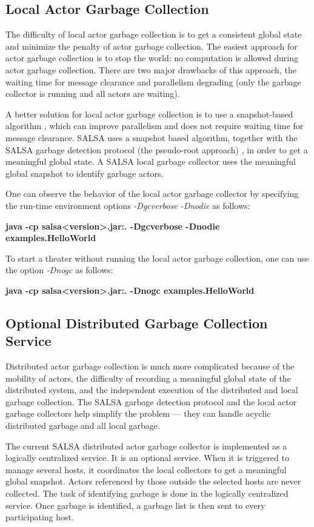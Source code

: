 \subsection{Local Actor Garbage Collection}
The difficulty of local actor garbage collection is to get a consistent 
global state and minimize the penalty 
of actor garbage collection. The easiest approach for actor garbage 
collection is to stop the world: no computation is allowed during actor 
garbage collection. There are two major drawbacks of this approach,
the waiting time for message clearance and 
parallelism degrading 
(only the garbage collector is running and all actors are waiting).

A better solution for local actor garbage collection is 
to use a snapshot-based algorithm \cite{wang-varela-snapshot-tr-2006}, which can improve parallelism 
and does not require waiting time for message clearance.
SALSA uses a snapshot based algorithm, together with the SALSA 
garbage detection protocol (the pseudo-root approach) \cite{wang06pr}, 
in order to get a meaningful global
state. A SALSA local garbage collector
uses the meaningful global snapshot to identify garbage actors.

One can observe the behavior of the local actor garbage collector by specifying
the run-time environment options \textit{-Dgcverbose -Dnodie} as follows:  

{\sloppy
\textbf{java -cp salsa{\textless}version{\textgreater}.jar:. -Dgcverbose -Dnodie examples.HelloWorld}
}

To start a theater without running the local actor garbage collection, one can
use the option \textit{-Dnogc} as follows:

\textbf{java -cp salsa{\textless}version{\textgreater}.jar:. -Dnogc examples.HelloWorld}


\subsection{Optional Distributed Garbage Collection Service}
Distributed actor garbage collection is much more complicated because of
the mobility of actors, the difficulty of recording a meaningful global 
state of the distributed system, and the independent execution of the 
distributed and local garbage collection. The SALSA garbage detection 
protocol and the local actor garbage collectors help simplify the problem
--- they can handle acyclic distributed garbage and all local garbage. 

The current SALSA distributed actor garbage collector is implemented as 
a logically centralized service. It is an optional service. When it is 
triggered to manage several hosts, it coordinates the local
collectors to get a meaningful global snapshot. Actors referenced by those 
outside the selected
hosts are never collected. The task of identifying garbage is 
done in the logically centralized service. Once garbage is identified, a garbage
list is then sent to every participating host.

